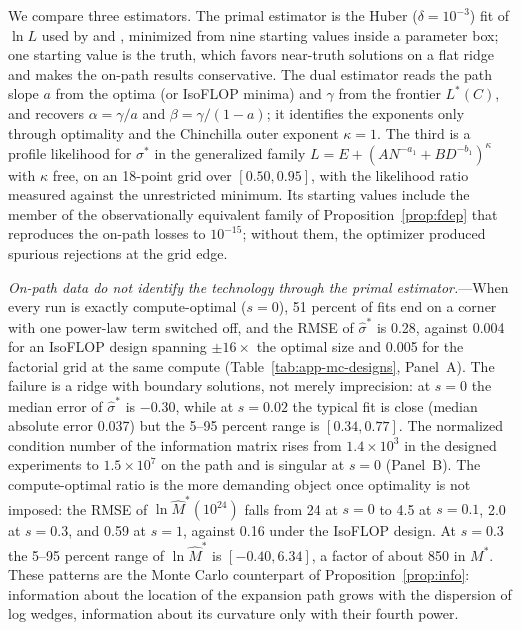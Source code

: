 We compare three estimators. The primal estimator is the Huber ($\delta=10^{-3}$) fit of $\ln L$ used by
\citet{hoffmann2022training} and \citet{besiroglu2024chinchilla}, minimized from nine starting values inside a
parameter box; one starting value is the truth, which favors near-truth solutions on a flat ridge and makes the
on-path results conservative. The dual estimator reads the path slope $a$ from the optima (or IsoFLOP minima) and
$\gamma$ from the frontier $L^*(C)$, and recovers $\alpha=\gamma/a$ and $\beta=\gamma/(1-a)$; it identifies the
exponents only through optimality and the Chinchilla outer exponent $\kappa=1$. The third is a profile likelihood
for $\sigma^*$ in the generalized family $L=E+(AN^{-a_1}+BD^{-b_1})^{\kappa}$ with $\kappa$ free, on an 18-point
grid over $[0.50,0.95]$, with the likelihood ratio measured against the unrestricted minimum. Its starting values
include the member of the observationally equivalent family of Proposition~\ref{prop:fdep} that reproduces the
on-path losses to $10^{-15}$; without them, the optimizer produced spurious rejections at the grid edge.

\emph{On-path data do not identify the technology through the primal estimator.}---When every run is exactly
compute-optimal ($s=0$), 51 percent of fits end on a corner with one power-law term switched off, and the RMSE of
$\hat\sigma^*$ is 0.28, against 0.004 for an IsoFLOP design spanning $\pm16\times$ the optimal size and 0.005 for
the factorial grid at the same compute (Table~\ref{tab:app-mc-designs}, Panel~A). The failure is a ridge with
boundary solutions, not merely imprecision: at $s=0$ the median error of $\hat\sigma^*$ is $-0.30$, while at
$s=0.02$ the typical fit is close (median absolute error 0.037) but the 5--95 percent range is $[0.34,0.77]$. The
normalized condition number of the information matrix rises from $1.4\times10^{3}$ in the designed experiments to
$1.5\times10^{7}$ on the path and is singular at $s=0$ (Panel~B). The compute-optimal ratio is the more demanding
object once optimality is not imposed: the RMSE of $\ln\hat M^*(10^{24})$ falls from 24 at $s=0$ to 4.5 at
$s=0.1$, 2.0 at $s=0.3$, and 0.59 at $s=1$, against 0.16 under the IsoFLOP design. At $s=0.3$ the 5--95 percent
range of $\ln\hat M^*$ is $[-0.40,6.34]$, a factor of about 850 in $M^*$. These patterns are the Monte Carlo
counterpart of Proposition~\ref{prop:info}: information about the location of the expansion path grows with the
dispersion of log wedges, information about its curvature only with their fourth power.

